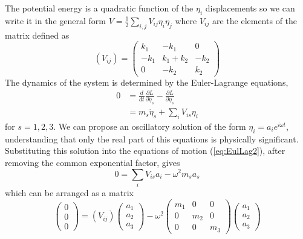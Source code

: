 The potential energy is a quadratic function of the $\eta_i$ displacements so we can write it in the general form $V=\frac{1}{2}\sum_{i,j}V_{ij}\eta_i\eta_j$ where $V_{ij}$ are the elements of the matrix defined as
%
\begin{equation}
  (V_{ij})=\left( \begin{array}{ccc} k_1 & -k_1 & 0 \\ -k_1 & k_1+k_2 & -k_2 \\ 0 & -k_2 & k_2 \end{array} \right)
\end{equation}
%
The dynamics of the system is determined by the Euler-Lagrange equations,
%
\begin{align}
  0 & = \frac{d}{dt}\frac{\partial L}{\partial \dot{\eta}_s}-\frac{\partial L}{\partial \eta_s} \label{eq:EulLag1} \\
    & = m_s \ddot{\eta}_s + \sum_i V_{is} \eta_i \label{eq:EulLag2}
\end{align}
%
for $s=1,2,3$. 
We can propose an oscillatory solution of the form $\eta_i=a_ie^{i\omega t}$, understanding that only the real part of this equations is physically significant.
Substituting this solution into the equations of motion (\ref{eq:EulLag2}), after removing the common exponential factor, gives
%
\begin{equation}
  0=\sum_i V_{is}a_i-\omega^2m_sa_s
\end{equation}
%
which can be arranged as a matrix
%
\begin{equation}
  \left( 
    \begin{array}{c} 
      0\\ 0\\ 0 
    \end{array}
  \right) = (V_{ij}) \left(
    \begin{array}{c}
      a_1 \\ a_2 \\ a_3 
    \end{array}
  \right) - \omega^2 \left(
    \begin{array}{ccc}
      m_1 & 0 & 0 \\ 0 & m_2 & 0 \\ 0 & 0 & m_3
    \end{array}\right) \left(
    \begin{array}{c} 
      a_1 \\ a_2 \\ a_3 
    \end{array}
  \right)
\end{equation}

